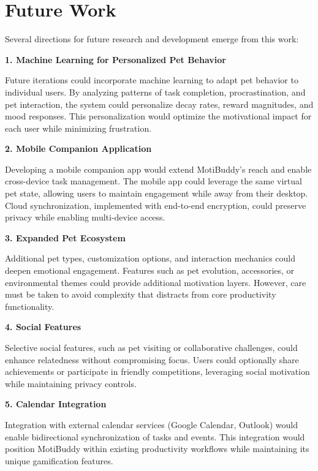 \section{Future Work}
\label{sec:future-work}

\completed

Several directions for future research and development emerge from this work:

\textbf{1. Machine Learning for Personalized Pet Behavior}

Future iterations could incorporate machine learning to adapt pet behavior to individual users. By analyzing patterns of task completion, procrastination, and pet interaction, the system could personalize decay rates, reward magnitudes, and mood responses. This personalization would optimize the motivational impact for each user while minimizing frustration.

\textbf{2. Mobile Companion Application}

Developing a mobile companion app would extend MotiBuddy's reach and enable cross-device task management. The mobile app could leverage the same virtual pet state, allowing users to maintain engagement while away from their desktop. Cloud synchronization, implemented with end-to-end encryption, could preserve privacy while enabling multi-device access.

\textbf{3. Expanded Pet Ecosystem}

Additional pet types, customization options, and interaction mechanics could deepen emotional engagement. Features such as pet evolution, accessories, or environmental themes could provide additional motivation layers. However, care must be taken to avoid complexity that distracts from core productivity functionality.

\textbf{4. Social Features}

Selective social features, such as pet visiting or collaborative challenges, could enhance relatedness without compromising focus. Users could optionally share achievements or participate in friendly competitions, leveraging social motivation while maintaining privacy controls.

\textbf{5. Calendar Integration}

Integration with external calendar services (Google Calendar, Outlook) would enable bidirectional synchronization of tasks and events. This integration would position MotiBuddy within existing productivity workflows while maintaining its unique gamification features.

